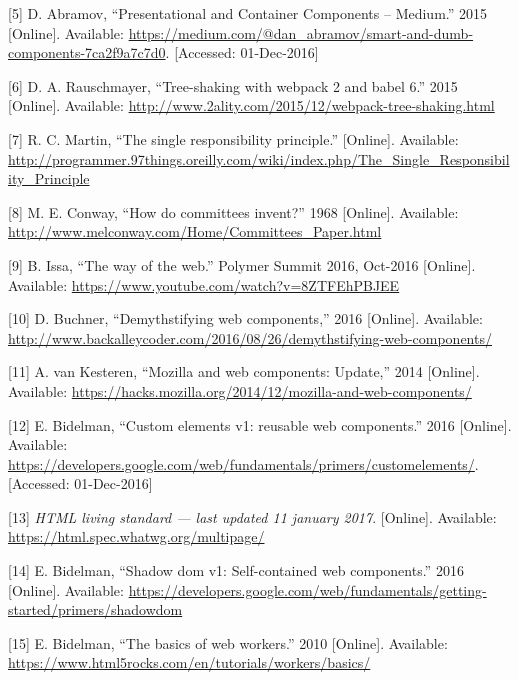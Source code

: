\documentclass[]{assets/latex/ieee}
\begin{document}
\hypertarget{ref-Abramov2015}{}
{[}5{]} D. Abramov, ``Presentational and Container Components --
Medium.'' 2015 {[}Online{]}. Available:
\url{https://medium.com/@dan_abramov/smart-and-dumb-components-7ca2f9a7c7d0}.
{[}Accessed: 01-Dec-2016{]}

\hypertarget{ref-Rauschmayer2015}{}
{[}6{]} D. A. Rauschmayer, ``Tree-shaking with webpack 2 and babel 6.''
2015 {[}Online{]}. Available:
\url{http://www.2ality.com/2015/12/webpack-tree-shaking.html}

\hypertarget{ref-Martin}{}
{[}7{]} R. C. Martin, ``The single responsibility principle.''
{[}Online{]}. Available:
\url{http://programmer.97things.oreilly.com/wiki/index.php/The_Single_Responsibility_Principle}

\hypertarget{ref-Conway1968}{}
{[}8{]} M. E. Conway, ``How do committees invent?'' 1968 {[}Online{]}.
Available: \url{http://www.melconway.com/Home/Committees_Paper.html}

\hypertarget{ref-Issa2016}{}
{[}9{]} B. Issa, ``The way of the web.'' Polymer Summit 2016, Oct-2016
{[}Online{]}. Available:
\url{https://www.youtube.com/watch?v=8ZTFEhPBJEE}

\hypertarget{ref-Buchner2016}{}
{[}10{]} D. Buchner, ``Demythstifying web components,'' 2016
{[}Online{]}. Available:
\url{http://www.backalleycoder.com/2016/08/26/demythstifying-web-components/}

\hypertarget{ref-vanKesteren2014}{}
{[}11{]} A. van Kesteren, ``Mozilla and web components: Update,'' 2014
{[}Online{]}. Available:
\url{https://hacks.mozilla.org/2014/12/mozilla-and-web-components/}

\hypertarget{ref-Bidelman2016}{}
{[}12{]} E. Bidelman, ``Custom elements v1: reusable web components.''
2016 {[}Online{]}. Available:
\url{https://developers.google.com/web/fundamentals/primers/customelements/}.
{[}Accessed: 01-Dec-2016{]}

\hypertarget{ref-HTML}{}
{[}13{]} \emph{HTML living standard --- last updated 11 january 2017}.
{[}Online{]}. Available: \url{https://html.spec.whatwg.org/multipage/}

\hypertarget{ref-Bidelman2016shadow}{}
{[}14{]} E. Bidelman, ``Shadow dom v1: Self-contained web components.''
2016 {[}Online{]}. Available:
\url{https://developers.google.com/web/fundamentals/getting-started/primers/shadowdom}

\hypertarget{ref-Bidelman2010}{}
{[}15{]} E. Bidelman, ``The basics of web workers.'' 2010 {[}Online{]}.
Available: \url{https://www.html5rocks.com/en/tutorials/workers/basics/}
\end{document}
